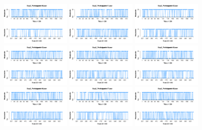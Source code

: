\documentclass[a4paper ]{article}
\begin{document}
\begin{figure}[th]
\includegraphics[width=0.3\textwidth]{Figures/Response_Exp2_P10} \includegraphics[width=0.3\textwidth]{Figures/Response_Exp2_P11} \includegraphics[width=0.3\textwidth]{Figures/Response_Exp2_P12}
\includegraphics[width=0.3\textwidth]{Figures/Response_Exp2_P13} \includegraphics[width=0.3\textwidth]{Figures/Response_Exp2_P14} \includegraphics[width=0.3\textwidth]{Figures/Response_Exp2_P15}
\includegraphics[width=0.3\textwidth]{Figures/Response_Exp2_P16} \includegraphics[width=0.3\textwidth]{Figures/Response_Exp2_P17} \includegraphics[width=0.3\textwidth]{Figures/Response_Exp2_P18}

\end{figure}
\end{document}
